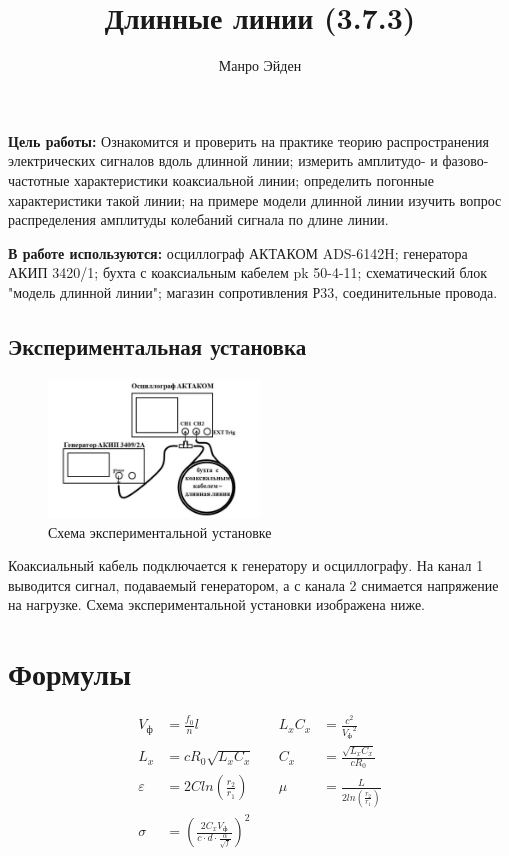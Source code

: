 \documentclass[a4paper, 12pt]{article}
\title{\textbf{Длинные линии (3.7.3)}}
\author{Манро Эйден}
\date{}
\begin{document}
\maketitle

\noindent \textbf{Цель работы:} Ознакомится и проверить на практике теорию распространения
электрических сигналов вдоль длинной линии; измерить амплитудо- и фазово-частотные
характеристики коаксиальной линии; определить погонные характеристики такой
линии; на примере модели длинной линии изучить вопрос распределения амплитуды
колебаний сигнала по длине линии.

\bigskip

\noindent \textbf{В работе используются:} осциллограф АКТАКОМ ADS-6142H; генератора АКИП 3420/1; бухта с коаксиальным кабелем pk 50-4-11; 
	схематический блок "модель длинной линии"; магазин сопротивления Р33, соединительные провода.



 \subsection*{Экспериментальная установка}
   \begin{figure}
  \vspace{-20pt}
  \begin{center}
    \includegraphics[width=0.5\textwidth]{ust.png}
    \caption{Схема экспериментальной установке}
  \end{center}
  \vspace{-10pt}
\end{figure}
 	Коаксиальный кабель подключается к генератору и осциллографу. На канал 1 выводится сигнал, подаваемый генератором, а с канала 2 снимается напряжение на нагрузке. Схема экспериментальной установки изображена ниже.
  
\section*{Формулы}

\begin{align*}
    V_{\text{ф}} &= \frac{f_0}{n} l & \quad L_xC_x &= \frac{c^2}{{V_{\text{ф}}}^2} \\
    L_x &= cR_0\sqrt{L_xC_x} & \quad C_x &= \frac{\sqrt{L_xC_x}}{cR_0} \\
   \varepsilon &= 2Cln\left(\frac{r_2}{r_1}\right) & \quad \mu &= \frac{L}{2ln\left(\frac{r_2}{r_1}\right)} \\
    \sigma &= \left( \frac{2C_xV_{\text{ф}}}{c \cdot d \cdot \frac{\alpha}{\sqrt{f}}} \right)^2 
\end{align*}
\end{document}
